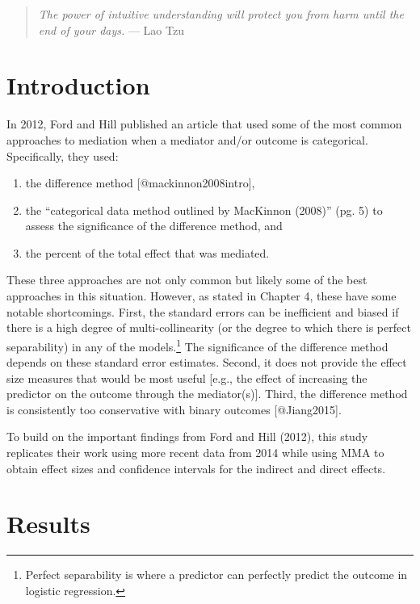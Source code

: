 \documentclass[]{article}
\title{}
\author{}
\date{}
\providecommand{\tightlist}{%
  \setlength{\itemsep}{0pt}\setlength{\parskip}{0pt}}
\let\rmarkdownfootnote\footnote%
\def\footnote{\protect\rmarkdownfootnote}
\begin{document}
\begin{quote}
\emph{The power of intuitive understanding will protect you from harm until the end of your days.}
--- Lao Tzu
\end{quote}

\doublespacing

\section{Introduction}\label{introduction}

In 2012, Ford and Hill published an article that used some of the most
common approaches to mediation when a mediator and/or outcome is
categorical. Specifically, they used:

\begin{enumerate}
\def\labelenumi{\arabic{enumi}.}
\tightlist
\item
  the difference method {[}@mackinnon2008intro{]},
\item
  the ``categorical data method outlined by MacKinnon (2008)'' (pg. 5)
  to assess the significance of the difference method, and
\item
  the percent of the total effect that was mediated.
\end{enumerate}

These three approaches are not only common but likely some of the best
approaches in this situation. However, as stated in Chapter 4, these
have some notable shortcomings. First, the standard errors can be
inefficient and biased if there is a high degree of multi-collinearity
(or the degree to which there is perfect separability) in any of the
models.\footnote{Perfect separability is where a predictor can perfectly predict the outcome in logistic regression.}
The significance of the difference method depends on these standard
error estimates. Second, it does not provide the effect size measures
that would be most useful {[}e.g., the effect of increasing the
predictor on the outcome through the mediator(s){]}. Third, the
difference method is consistently too conservative with binary outcomes
{[}@Jiang2015{]}.

To build on the important findings from Ford and Hill (2012), this study
replicates their work using more recent data from 2014 while using MMA
to obtain effect sizes and confidence intervals for the indirect and
direct effects.

\section{Results}\label{results}
\end{document}
